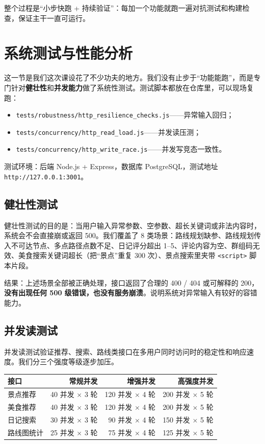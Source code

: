 \documentclass[UTF8,a4paper,12pt]{ctexart}
\begin{document}
整个过程是“小步快跑 + 持续验证”：每加一个功能就跑一遍对抗测试和构建检查，保证主干一直可运行。

\section{系统测试与性能分析}

这一节是我们这次课设花了不少功夫的地方。我们没有止步于“功能能跑”，而是专门针对\textbf{健壮性}和\textbf{并发能力}做了系统性测试。测试脚本都放在仓库里，可以现场复跑：

\begin{itemize}
\item \texttt{tests/robustness/http\_resilience\_checks.js}——异常输入回归；
\item \texttt{tests/concurrency/http\_read\_load.js}——并发读压测；
\item \texttt{tests/concurrency/http\_write\_race.js}——并发写竞态一致性。
\end{itemize}

测试环境：后端 Node.js + Express，数据库 PostgreSQL，测试地址 \texttt{http://127.0.0.1:3001}。

\subsection{健壮性测试}
健壮性测试的目的是：当用户输入异常参数、空参数、超长关键词或非法内容时，系统会不会直接崩或返回 500。我们覆盖了 8 类场景：路线规划缺参、路线规划传入不可达节点、多点路径点数不足、日记评分超出 1--5、评论内容为空、群组码无效、美食搜索关键词超长（把“景点”重复 300 次）、景点搜索里夹带 \texttt{<script>} 脚本片段。

结果：上述场景全部被正确处理，接口返回了合理的 400 / 404 或可解释的 200，\textbf{没有出现任何 500 级错误，也没有服务崩溃}。说明系统对异常输入有较好的容错能力。

\subsection{并发读测试}
并发读测试验证推荐、搜索、路线类接口在多用户同时访问时的稳定性和响应速度。我们分三个强度等级逐步加压。

\begin{longtable}{lrrr}
\toprule
\textbf{接口} & \textbf{常规并发} & \textbf{增强并发} & \textbf{高强度并发} \\
\midrule
\endhead
景点推荐 & 40 并发 $\times$ 3 轮 & 120 并发 $\times$ 4 轮 & 200 并发 $\times$ 5 轮 \\
美食推荐 & 40 并发 $\times$ 3 轮 & 120 并发 $\times$ 4 轮 & 200 并发 $\times$ 5 轮 \\
日记搜索 & 30 并发 $\times$ 3 轮 & 90 并发 $\times$ 4 轮 & 150 并发 $\times$ 5 轮 \\
路线图统计 & 25 并发 $\times$ 3 轮 & 75 并发 $\times$ 4 轮 & 125 并发 $\times$ 5 轮 \\
\bottomrule
\end{longtable}
\end{document}
